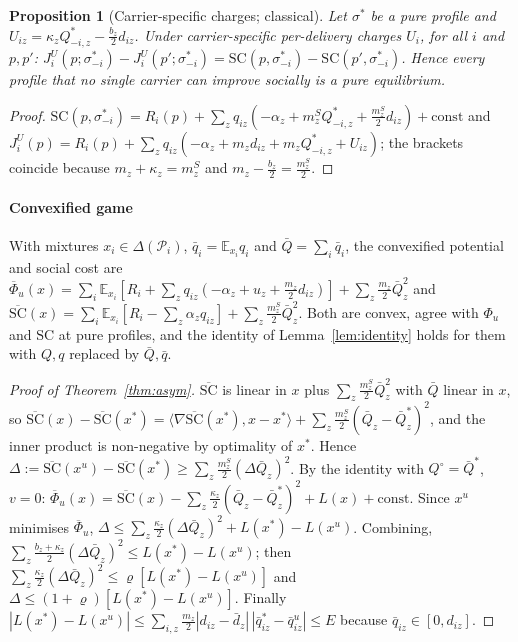 \documentclass[preprint,11pt]{elsarticle}
\newtheorem{proposition}[theorem]{Proposition}
\theoremstyle{definition}
\theoremstyle{remark}
\newcommand{\E}{\mathbb{E}}
\newcommand{\ip}[2]{\langle #1,#2\rangle}
\begin{document}
\begin{proposition}[Carrier-specific charges; classical]\label{prop:pers}
Let $\sigma^*$ be a pure profile and $U_{iz}=\kappa_zQ^*_{-i,z}-\tfrac{b_z}{2}d_{iz}$. Under carrier-specific per-delivery charges $U_i$, for all $i$ and $p,p'$: $J^U_i(p;\sigma^*_{-i})-J^U_i(p';\sigma^*_{-i})=\mathrm{SC}(p,\sigma^*_{-i})-\mathrm{SC}(p',\sigma^*_{-i})$. Hence every profile that no single carrier can improve socially is a pure equilibrium.
\end{proposition}
\begin{proof}
$\mathrm{SC}(p,\sigma^*_{-i})=R_i(p)+\sum_zq_{iz}(-\alpha_z+m^S_zQ^*_{-i,z}+\tfrac{m^S_z}{2}d_{iz})+\text{const}$ and $J^U_i(p)=R_i(p)+\sum_zq_{iz}(-\alpha_z+m_zd_{iz}+m_zQ^*_{-i,z}+U_{iz})$; the brackets coincide because $m_z+\kappa_z=m^S_z$ and $m_z-\tfrac{b_z}{2}=\tfrac{m^S_z}{2}$.
\end{proof}

\paragraph{Convexified game} With mixtures $x_i\in\Delta(\mathcal P_i)$, $\bar q_i=\E_{x_i}q_i$ and $\bar Q=\sum_i\bar q_i$, the convexified potential and social cost are
$\overline\Phi_u(x)=\sum_i\E_{x_i}[R_i+\sum_zq_{iz}(-\alpha_z+u_z+\tfrac{m_z}{2}d_{iz})]+\sum_z\tfrac{m_z}{2}\bar Q_z^2$ and
$\overline{\mathrm{SC}}(x)=\sum_i\E_{x_i}[R_i-\sum_z\alpha_zq_{iz}]+\sum_z\tfrac{m^S_z}{2}\bar Q_z^2$. Both are convex, agree with $\Phi_u$ and $\mathrm{SC}$ at pure profiles, and the identity of Lemma~\ref{lem:identity} holds for them with $Q,q$ replaced by $\bar Q,\bar q$.

\begin{proof}[Proof of Theorem~\ref{thm:asym}]
$\overline{\mathrm{SC}}$ is linear in $x$ plus $\sum_z\tfrac{m^S_z}{2}\bar Q_z^2$ with $\bar Q$ linear in $x$, so $\overline{\mathrm{SC}}(x)-\overline{\mathrm{SC}}(x^*)=\ip{\nabla\overline{\mathrm{SC}}(x^*)}{x-x^*}+\sum_z\tfrac{m^S_z}{2}(\bar Q_z-\bar Q^*_z)^2$, and the inner product is non-negative by optimality of $x^*$. Hence $\Delta:=\overline{\mathrm{SC}}(x^u)-\overline{\mathrm{SC}}(x^*)\ge\sum_z\tfrac{m^S_z}{2}(\Delta\bar Q_z)^2$. By the identity with $Q^\circ=\bar Q^*$, $v=0$: $\overline\Phi_u(x)=\overline{\mathrm{SC}}(x)-\sum_z\tfrac{\kappa_z}{2}(\bar Q_z-\bar Q^*_z)^2+L(x)+\text{const}$. Since $x^u$ minimises $\overline\Phi_u$, $\Delta\le\sum_z\tfrac{\kappa_z}{2}(\Delta\bar Q_z)^2+L(x^*)-L(x^u)$. Combining, $\sum_z\tfrac{b_z+\kappa_z}{2}(\Delta\bar Q_z)^2\le L(x^*)-L(x^u)$; then $\sum_z\tfrac{\kappa_z}{2}(\Delta\bar Q_z)^2\le\varrho[L(x^*)-L(x^u)]$ and $\Delta\le(1+\varrho)[L(x^*)-L(x^u)]$. Finally $|L(x^*)-L(x^u)|\le\sum_{i,z}\tfrac{m_z}{2}|d_{iz}-\bar d_z|\,|\bar q^*_{iz}-\bar q^u_{iz}|\le E$ because $\bar q_{iz}\in[0,d_{iz}]$.
\end{proof}
\end{document}
